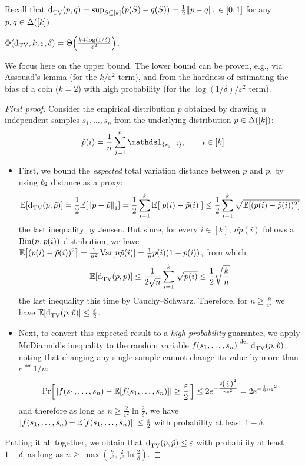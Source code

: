 \documentclass[10pt]{article}
\newcommand{\dst}{\varepsilon}
\newcommand{\ab}{k}
\newcommand{\ns}{n}
\begin{document}
Recall that $\totalvardist{p}{q} = \sup_{S\subseteq [\ab]} (p(S)-q(S)) = \frac{1}{2}\normone{p-q}\in[0,1]$ for any $p,q\in\distribs{[\ab]}$. 
\begin{theorem}\label{theo:learning:tv}
  $\Phi(\dtv,\ab,\dst,\delta) = \bigTheta{\frac{\ab+\log(1/\delta)}{\dst^2}}$.
\end{theorem}
\noindent We focus here on the upper bound. The lower bound can be proven, e.g., via Assouad's lemma (for the $\ab/\dst^2$ term), and from the hardness of estimating the bias of a coin ($\ab=2$) with high probability (for the $\log(1/\delta)/\dst^2$ term).
\begin{proof}[First proof]
Consider the empirical distribution $\tilde{p}$ obtained by drawing $\ns$ independent samples $s_1,\dots,s_\ns$ from the underlying distribution $p\in\distribs{[\ab]}$:
\begin{equation}\label{def:empirical}
\tilde{p}(i) = \frac{1}{\ns} \sum_{j=1}^\ns \indic{s_j=i}, \qquad i\in [\ab]
\end{equation}
\begin{itemize}
  \item First, we bound the \emph{expected} total variation distance between $\tilde{p}$ and $p$, by using $\lp[2]$ distance as a proxy:
\[
    \expect{ \totalvardist{p}{\tilde{p}} }
    =\frac{1}{2}\expect{ \normone{p-\tilde{p}}} 
    =\frac{1}{2}\sum_{i=1}^\ab\expect{ \abs{p(i)-\tilde{p}(i)}}
    \leq\frac{1}{2}\sum_{i=1}^\ab\sqrt{\expect{ (p(i)-\tilde{p}(i))^2} }
\]
the last inequality by Jensen. But since, for every $i\in[\ab]$, $\ns\tilde{p}(i)$ follows a $\binomial{\ns}{p(i)}$ distribution, we have
$\expect{ (p(i)-\tilde{p}(i))^2} = \frac{1}{\ns^2}\var[\ns\tilde{p}(i)] = \frac{1}{\ns}p(i)(1-p(i))$, from which
\[
    \expect{ \totalvardist{p}{\tilde{p}} } \leq\frac{1}{2\sqrt{\ns}}\sum_{i=1}^\ab\sqrt{p(i)} \leq \frac{1}{2}\sqrt{\frac{\ab}{\ns}}
\]
the last inequality this time by Cauchy--Schwarz. Therefore, for $\ns\geq \frac{\ab}{\dst^2}$ we have $\expect{ \totalvardist{p}{\tilde{p}} }\leq \frac{\dst}{2}$.

  \item Next, to convert this expected result to a \emph{high probability} guarantee, we apply McDiarmid's inequality to the random variable $f(s_1,\dots,s_\ns) \eqdef \totalvardist{p}{\tilde{p}}$, noting that changing any single sample cannot change its value by more than $c\eqdef 1/\ns$:
\[
    \probaOf{ \abs{f(s_1,\dots,s_\ns) - \expect{f(s_1,\dots,s_\ns)}} \geq \frac{\dst}{2} } \leq 2e^{-\frac{2\left(\frac{\dst}{2}\right)^2}{\ns c^2}} = 2e^{-\frac{1}{2}\ns\dst^2}
\]
and therefore as long as $\ns\geq \frac{2}{\dst^2}\ln\frac{2}{\delta}$, we have $\abs{f(s_1,\dots,s_\ns) - \expect{f(s_1,\dots,s_\ns)}} \leq \frac{\dst}{2}$ with probability at least $1-\delta$. 
\end{itemize}
Putting it all together, we obtain that $\totalvardist{p}{\tilde{p}} \leq \dst$ with probability at least $1-\delta$, as long as $\ns\geq \max\left( \frac{\ab}{\dst^2},\frac{2}{\dst^2}\ln\frac{2}{\delta} \right)$.
\end{proof}
\end{document}
